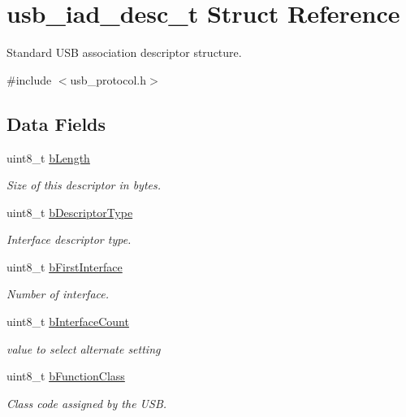 \hypertarget{structusb__iad__desc__t}{
\section{usb\-\_\-iad\-\_\-desc\-\_\-t \-Struct \-Reference}
\label{structusb__iad__desc__t}
}


\-Standard \-U\-S\-B association descriptor structure.  




{\ttfamily \#include $<$usb\-\_\-protocol.\-h$>$}

\subsection*{\-Data \-Fields}
\begin{DoxyCompactItemize}
\item 
uint8\-\_\-t \hyperlink{structusb__iad__desc__t_a13a3d5b27f54c67d2115e48902ce68c7}{b\-Length}
\begin{DoxyCompactList}\small\item\em \-Size of this descriptor in bytes. \end{DoxyCompactList}\item 
uint8\-\_\-t \hyperlink{structusb__iad__desc__t_aad5b760da92290217db3463a7342a7b4}{b\-Descriptor\-Type}
\begin{DoxyCompactList}\small\item\em \-Interface descriptor type. \end{DoxyCompactList}\item 
uint8\-\_\-t \hyperlink{structusb__iad__desc__t_a0d32a4f394cd5bc64295725434eeccfd}{b\-First\-Interface}
\begin{DoxyCompactList}\small\item\em \-Number of interface. \end{DoxyCompactList}\item 
uint8\-\_\-t \hyperlink{structusb__iad__desc__t_a405850b6548dd1b924e386e3bd8569eb}{b\-Interface\-Count}
\begin{DoxyCompactList}\small\item\em value to select alternate setting \end{DoxyCompactList}\item 
uint8\-\_\-t \hyperlink{structusb__iad__desc__t_ae013d91f59930b0343201cfe6d5ad82b}{b\-Function\-Class}
\begin{DoxyCompactList}\small\item\em \-Class code assigned by the \-U\-S\-B. \end{DoxyCompactList}\item 

\end{DoxyCompactItemize}
